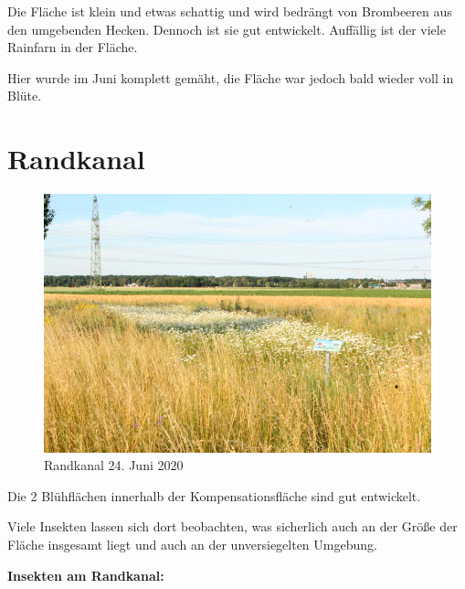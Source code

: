 \documentclass[11pt]{article}
\begin{document}
Die Fläche ist klein und etwas schattig und wird bedrängt von Brombeeren aus den umgebenden Hecken.
Dennoch ist sie gut entwickelt. Auffällig ist der viele Rainfarn in der Fläche.

Hier wurde im Juni komplett gemäht, die Fläche war jedoch bald wieder voll in Blüte.

\clearpage
\section{Randkanal}
\begin{figure}[h!]
  \includegraphics[width=\linewidth]{img/randkanal/juni.jpg}
  \caption{Randkanal 24. Juni 2020}
  \label{fig:randkanal juni}
\end{figure}

Die 2 Blühflächen innerhalb der Kompensationsfläche sind gut entwickelt.

Viele Insekten lassen sich dort beobachten, was sicherlich auch an der Größe der Fläche insgesamt liegt und auch an der unversiegelten Umgebung.

\clearpage
\textbf{Insekten am Randkanal:}
\end{document}
